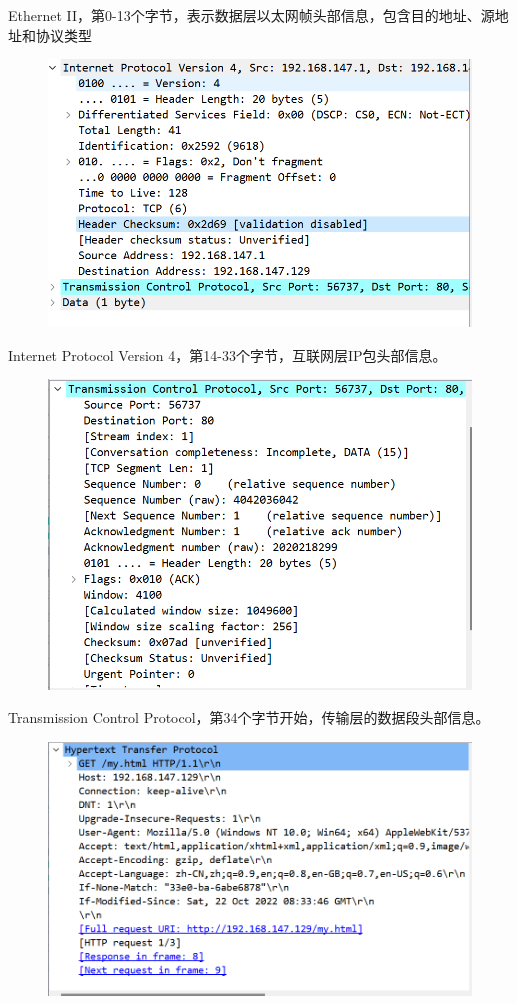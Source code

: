 \documentclass[UTF8,a4paper,10pt]{ctexart}
\begin{document}
Ethernet II，第0-13个字节，表示数据层以太网帧头部信息，包含目的地址、源地址和协议类型
\begin{figure}[H]
    \centering
    \includegraphics[scale=0.6]{8.png}
    \label{fig:8}
\end{figure}
Internet Protocol Version 4，第14-33个字节，互联网层IP包头部信息。
\begin{figure}[H]
    \centering
    \includegraphics[scale=0.5]{9.png}
    \label{fig:9}
\end{figure}
Transmission Control Protocol，第34个字节开始，传输层的数据段头部信息。
\begin{figure}[H]
    \centering
    \includegraphics[scale=0.5]{10.png}
    \label{fig:10}
\end{figure}
\end{document}
